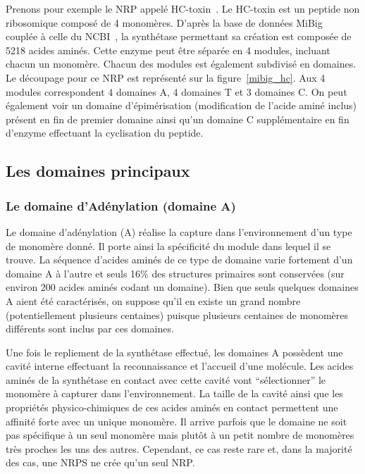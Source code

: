 Prenons pour exemple le NRP appelé HC-toxin~\cite{_mibig:_????}.
Le HC-toxin est un peptide non ribosomique composé de 4 monomères.
D'après la base de données MiBig~\cite{medema_minimum_2015} couplée à celle du NCBI~\cite{ncbi_resource_coordinators_database_2013}, la synthétase permettant sa création est composée de 5218 acides aminés.
Cette enzyme peut être séparée en 4 modules, incluant chacun un monomère.
Chacun des modules est également subdivisé en domaines.
Le découpage pour ce NRP est représenté sur la figure~\ref{mibig_hc}.
Aux 4 modules correspondent 4 domaines A, 4 domaines T et 3 domaines C.
On peut également voir un domaine d'épimérisation (modification de l'acide aminé inclus) présent en fin de premier domaine ainsi qu'un domaine C supplémentaire en fin d'enzyme effectuant la cyclisation du peptide.

\subsection{Les domaines principaux}

\subsubsection{Le domaine d'Adénylation (domaine A)}

Le domaine d'adénylation (A) réalise la capture dans l'environnement d'un type de monomère donné.
Il porte ainsi la spécificité du module dans lequel il se trouve.
La séquence d'acides aminés de ce type de domaine varie fortement d'un domaine A à l'autre et seuls 16\% des structures primaires sont conservées (sur environ 200 acides aminés codant un domaine).
Bien que seuls quelques domaines A aient été caractérisés, on suppose qu'il en existe un grand nombre (potentiellement plusieurs centaines) puisque
plusieurs centaines de monomères différents sont inclus par ces domaines.

Une fois le repliement de la synthétase effectué, les domaines A possèdent une cavité interne effectuant la reconnaissance et l'accueil d'une molécule.
Les acides aminés de la synthétase en contact avec cette cavité vont ``sélectionner'' le monomère à capturer dans l'environnement.
La taille de la cavité ainsi que les propriétés physico-chimiques de ces acides aminés en contact permettent une affinité forte avec un unique monomère.
Il arrive parfois que le domaine ne soit pas spécifique à un seul monomère mais plutôt à un petit nombre de monomères très proches les uns des autres.
Cependant, ce cas reste rare et, dans la majorité des cas, une NRPS ne crée qu'un seul NRP.

